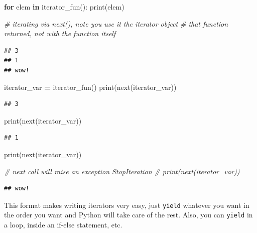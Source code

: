 \documentclass[
]{book}
\newenvironment{Shaded}{\begin{snugshade}}{\end{snugshade}}
\newcommand{\BuiltInTok}[1]{#1}
\newcommand{\CommentTok}[1]{\textcolor[rgb]{0.56,0.35,0.01}{\textit{#1}}}
\newcommand{\ControlFlowTok}[1]{\textcolor[rgb]{0.13,0.29,0.53}{\textbf{#1}}}
\newcommand{\KeywordTok}[1]{\textcolor[rgb]{0.13,0.29,0.53}{\textbf{#1}}}
\newcommand{\NormalTok}[1]{#1}
\newcommand{\OperatorTok}[1]{\textcolor[rgb]{0.81,0.36,0.00}{\textbf{#1}}}
\begin{document}
\begin{Shaded}
\begin{Highlighting}[]
\ControlFlowTok{for}\NormalTok{ elem }\KeywordTok{in}\NormalTok{ iterator\_fun():}
    \BuiltInTok{print}\NormalTok{(elem)}
    
\CommentTok{\# iterating via next(), note you use it the iterator object }
\CommentTok{\# that function returned, not with the function itself }
\end{Highlighting}
\end{Shaded}

\begin{verbatim}
## 3
## 1
## wow!
\end{verbatim}

\begin{Shaded}
\begin{Highlighting}[]
\NormalTok{iterator\_var }\OperatorTok{=}\NormalTok{ iterator\_fun()  }
\BuiltInTok{print}\NormalTok{(}\BuiltInTok{next}\NormalTok{(iterator\_var))}
\end{Highlighting}
\end{Shaded}

\begin{verbatim}
## 3
\end{verbatim}

\begin{Shaded}
\begin{Highlighting}[]
\BuiltInTok{print}\NormalTok{(}\BuiltInTok{next}\NormalTok{(iterator\_var))}
\end{Highlighting}
\end{Shaded}

\begin{verbatim}
## 1
\end{verbatim}

\begin{Shaded}
\begin{Highlighting}[]
\BuiltInTok{print}\NormalTok{(}\BuiltInTok{next}\NormalTok{(iterator\_var))}

\CommentTok{\# next call will raise an exception StopIteration}
\CommentTok{\# print(next(iterator\_var))}
\end{Highlighting}
\end{Shaded}

\begin{verbatim}
## wow!
\end{verbatim}

This format makes writing iterators very easy, just \texttt{yield} whatever you want in the order you want and Python will take care of the rest. Also, you can \texttt{yield} in a loop, inside an if-else statement, etc.
\end{document}
